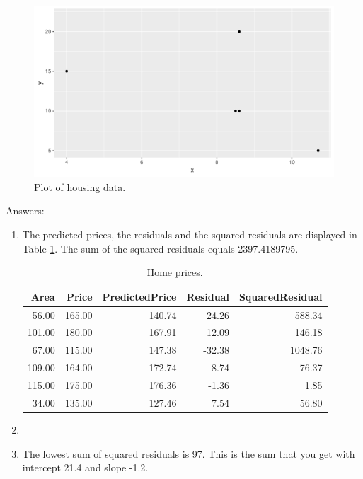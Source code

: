 \documentclass[]{report}\usepackage[]{graphicx}\usepackage[]{color}
\makeatletter
\def\maxwidth{ %
  \ifdim\Gin@nat@width>\linewidth
    \linewidth
  \else
    \Gin@nat@width
  \fi
}
\newenvironment{knitrout}{}{} %
\makeatother
\begin{document}
\begin{enumerate}
\begin{knitrout}
\begin{figure}
{\centering \includegraphics[width=\maxwidth]{figure/lm_16-1} 

}

\caption[Plot of housing data]{Plot of housing data.}\label{fig:lm_16}
\end{figure}


\end{knitrout}


\end{enumerate}

Answers:
\begin{enumerate}

\item The predicted prices, the residuals and the squared residuals are displayed in Table \ref{tab:lm_17}. The sum of the squared residuals equals 2397.4189795.

\begin{table}[ht]
\centering
\caption{Home prices.} 
\label{tab:lm_17}
\begin{tabular}{rrrrr}
  \hline
Area & Price & PredictedPrice & Residual & SquaredResidual \\ 
  \hline
56.00 & 165.00 & 140.74 & 24.26 & 588.34 \\ 
  101.00 & 180.00 & 167.91 & 12.09 & 146.18 \\ 
  67.00 & 115.00 & 147.38 & -32.38 & 1048.76 \\ 
  109.00 & 164.00 & 172.74 & -8.74 & 76.37 \\ 
  115.00 & 175.00 & 176.36 & -1.36 & 1.85 \\ 
  34.00 & 135.00 & 127.46 & 7.54 & 56.80 \\ 
   \hline
\end{tabular}
\end{table}

\item

\item The lowest sum of squared residuals is 97. This is the sum that you get with intercept 21.4 and slope -1.2.

\end{enumerate}
\end{document}
